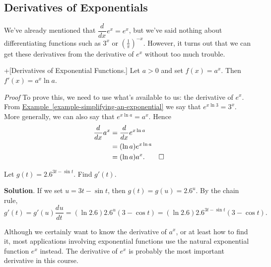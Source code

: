 \documentclass[10pt,]{book}
\makeatletter
\theoremstyle{ptxplainnotitle}
\theoremstyle{ptxplaintitle}
\theoremstyle{ptxplainnotitle}
\theoremstyle{ptxplaintitle}
\theoremstyle{ptxplainnotitle}
\theoremstyle{ptxplaintitle}
\renewcommand*{\proofname}{Proof}
\renewenvironment{proof}[1][\proofname]{\par
  \pushQED{\qed}%
  \normalfont \topsep6\p@\@plus6\p@\relax
  \trivlist
  \item\relax
    {\itshape
    #1\@addpunct{.}}\hspace\labelsep\ignorespaces
}{%
  \popQED\endtrivlist\@endpefalse
}
\theoremstyle{ptxdefinitionnotitle}
\theoremstyle{ptxdefinitiontitle}
\theoremstyle{ptxdefinitionnotitle}
\theoremstyle{ptxdefinitiontitle}
\theoremstyle{ptxdefinitionnotitle}
\theoremstyle{ptxdefinitiontitle}
\theoremstyle{ptxdefinitionnotitle}
\theoremstyle{ptxdefinitiontitle}
\theoremstyle{ptxdefinitionnotitle}
\theoremstyle{ptxdefinitiontitle}
\numberwithin{equation}{section}
\newcommand{\dv}[3][]{\dfrac{d^{#1} #2}{d #3^{#1}}}
\makeatother
\begin{document}
\subsection[{Derivatives of Exponentials}]{Derivatives of Exponentials}\label{subsection-derivatives-of-exponentials}
\hypertarget{p-226}{}%
We've already mentioned that \(\dv{}{x}e^{x} = e^{x}\), but we've said nothing about differentiating functions such as \(3^{x}\) or \((\frac{1}{\pi})^{-x}\). However, it turns out that we can get these derivatives from the derivative of \(e^{x}\) without too much trouble.%
\begin{theorem}+[{Derivatives of Exponential Functions.}]\label{theorem-derivatives-of-exponential-functions}
\hypertarget{p-227}{}%
Let \(a > 0\) and set \(f(x) = a^{x}\). Then \(f'(x) = a^{x}\ln a\).%
\end{theorem}
\begin{proof}\hypertarget{proof-5}{}
\hypertarget{p-228}{}%
To prove this, we need to use what's available to us: the derivative of \(e^{x}\). From \hyperref[example-simplifying-an-exponential]{Example~\ref{example-simplifying-an-exponential}} we say that \(e^{x\ln 3} = 3^{x}\). More generally, we can also say that \(e^{x\ln a} = a^{x}\). Hence%
\begin{align*}
\dv{}{x}a^{x} & = \dv{}{x}e^{x\ln a} \\
& = (\ln a)e^{x\ln a} \\
& = (\ln a)a^{x}. \qedhere
\end{align*}
%
\end{proof}
\begin{example}\label{example-differentiating-an-exponential}
\hypertarget{p-229}{}%
Let \(g(t) = 2.6^{3t - \sin t}\). Find \(g'(t)\).%
\par\smallskip%
\noindent\textbf{Solution}.\hypertarget{solution-49}{}\quad%
\hypertarget{p-230}{}%
If we set \(u = 3t - \sin t\), then \(g(t) = g(u) = 2.6^{u}\). By the chain rule, \(g'(t) = g'(u)\dv{u}{t} = (\ln2.6)2.6^{u}(3-\cos t) = (\ln2.6)2.6^{3t-\sin t}(3-\cos t).\)%
\end{example}
\hypertarget{p-231}{}%
Although we certainly want to know the derivative of \(a^{x}\), or at least how to find it, most applications involving exponential functions use the natural exponential function \(e^{x}\) instead. The derivative of \(e^{x}\) is probably the most important derivative in this course.%
\end{document}
